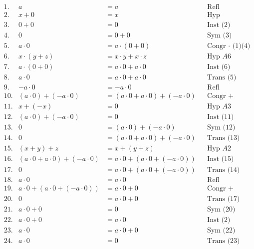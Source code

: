 \documentclass[a4paper]{article}
\begin{document}
\begin{align*}
    &\text{1.} & a &= a & &\text{Refl} \\
    &\text{2.} & x + 0 &= x & &\text{Hyp} \\
    &\text{3.} & 0 + 0 &= 0 & &\text{Inst (2)} \\
    &\text{4.} & 0 &= 0 + 0 & &\text{Sym (3)} \\
    &\text{5.} & a \cdot 0 &= a \cdot (0 + 0) & &\text{Congr \(\cdot\) (1)(4)} \\
    &\text{6.} & x \cdot (y + z) &= x \cdot y + x \cdot z & &\text{Hyp } A6 \\
    &\text{7.} & a \cdot (0 + 0) &= a \cdot 0 + a \cdot 0 & &\text{Inst (6)} \\
    &\text{8.} & a \cdot 0 &= a \cdot 0 + a \cdot 0 & &\text{Trans (5)(7)} \\
    &\text{9.} & -a \cdot 0 &= -a \cdot 0 & &\text{Refl} \\
    &\text{10.} & (a \cdot 0) + (-a \cdot 0) &= (a \cdot 0 + a \cdot 0) + (-a \cdot 0) & &\text{Congr + (8)(9)} \\
    &\text{11.} & x + (-x) &= 0 & &\text{Hyp } A3\\
    &\text{12.} & (a \cdot 0) + (-a \cdot 0) &= 0 & &\text{Inst (11)} \\
    &\text{13.} & 0 &= (a \cdot 0) + (-a \cdot 0) & &\text{Sym (12)} \\
    &\text{14.} & 0 &= (a \cdot 0 + a \cdot 0) + (-a \cdot 0)  & &\text{Trans (13)(10)} \\
    &\text{15.} & (x + y) + z &= x + (y + z) & &\text{Hyp } A2 \\
    &\text{16.} &  (a \cdot 0 + a \cdot 0) + (-a \cdot 0) &= a \cdot 0 + (a \cdot 0 + (-a \cdot 0))  & &\text{Inst (15)} \\
    &\text{17.} &  0 &= a \cdot 0 + (a \cdot 0 + (-a \cdot 0))  & &\text{Trans (14)(16)} \\
    &\text{18.} & a \cdot 0 &= a \cdot 0 & &\text{Refl} \\
    &\text{19.} & a \cdot 0 + (a \cdot 0 + (-a \cdot 0)) &= a \cdot 0 + 0  & &\text{Congr + (18)(12)} \\
    &\text{20.} & 0 &= a \cdot 0 + 0 & &\text{Trans (17)(19)} \\
    &\text{21.} & a \cdot 0 + 0 &= 0 & &\text{Sym (20)} \\
    &\text{22.} & a \cdot 0 + 0 &= a \cdot 0 & &\text{Inst (2)} \\
    &\text{23.} & a \cdot 0 &= a \cdot 0 + 0 & &\text{Sym (22)} \\
    &\text{24.} & a \cdot 0 &= 0 & &\text{Trans (23)(21)}
\end{align*}
\end{document}
